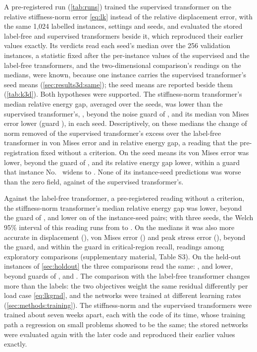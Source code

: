 A pre-registered run (\cref{tab:runs}) trained the supervised transformer on the relative
stiffness-norm error \eqref{eq:lk} instead of the relative displacement error, with the same
1,024 labelled instances, settings and seeds, and evaluated the stored label-free and
supervised transformers beside it, which reproduced their earlier values exactly. Its
verdicts read each seed's median over the 256 validation instances, a statistic fixed after
the per-instance values of the supervised and the label-free transformers, and the
two-dimensional comparison's readings on the medians, were known, because one instance
carries the supervised transformer's seed means (\cref{sec:results3d:same}); the seed means
are reported beside them (\cref{tab:k3d}). Both hypotheses were supported. The
stiffness-norm transformer's median relative energy gap, \numKdKnormGapMedian{} averaged
over the seeds, was \numKdGapRel{} lower than the supervised transformer's,
\numKdLabGapMedian{}, beyond the noise guard of \numKdGapTau{}, and its median von Mises
error \numKdVmRel{} lower (guard \numKdVmTau{}), in each seed. Descriptively, on these
medians the change of norm removed \numKdClosureVm{} of the supervised transformer's excess
over the label-free transformer in von Mises error and \numKdClosureGap{} in relative energy
gap, a reading that the pre-registration fixed without a criterion. On the seed means its
von Mises error was \numKdMeansVmRel{} lower, beyond the guard of \numKdMeansVmTau{}, and
its relative energy gap \numKdMeansGapRel{} lower, within a guard that instance
No.~\numWorstIndex{} widens to \numKdMeansGapTau{}. None of its \numThreePairs{}
instance-seed predictions was worse than the zero field, against \numThreeLabWorse{} of the
supervised transformer's.

Against the label-free transformer, a pre-registered reading without a criterion, the
stiffness-norm transformer's median relative energy gap was \numKdFreeRel{} lower, beyond the
guard of \numKdFreeTau{}, and lower on \numKdFreePairs{} of the \numThreePairs{}
instance-seed pairs; with three seeds, the Welch 95\% interval of this reading runs from
\numKdFreeWelchLow{} to \numKdFreeWelchHigh{}. On the medians it was also more accurate in
displacement (\numKdFreeDispRel{}), von Mises error (\numKdFreeVmRel{}) and peak stress error
(\numKdFreePeakRel{}), beyond the guard, and within the guard in critical-region recall,
readings among \numKdSecondary{} exploratory comparisons (supplementary material, Table S3).
On the \numHoldThreeN{} held-out instances of \cref{sec:holdout} the three comparisons read
the same: \numKdHoldGapRel{}, \numKdHoldVmRel{} and \numKdHoldFreeRel{} lower, beyond guards
of \numKdHoldGapTau{}, \numKdHoldVmTau{} and \numKdHoldFreeTau{}. The comparison with the
label-free transformer changes more than the labels: the two objectives weight the same
residual differently per load case \eqref{eq:lkgrad}, and the networks were trained at
different learning rates (\cref{sec:methods:training}). The stiffness-norm and the supervised
transformers were trained about seven weeks apart, each with the code of its time, whose
training path a regression on small problems showed to be the same; the stored networks were
evaluated again with the later code and reproduced their earlier values exactly.

